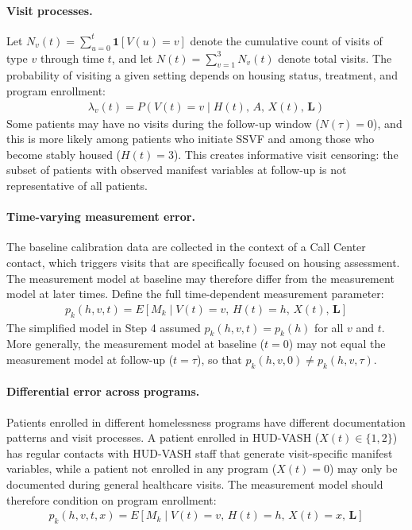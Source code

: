 \paragraph{Visit processes.} Let $N_v(t) = \sum_{u=0}^{t} \mathbf{1}[V(u)=v]$ denote the cumulative count of visits of type $v$ through time $t$, and let $N(t) = \sum_{v=1}^{3} N_v(t)$ denote total visits. The probability of visiting a given setting depends on housing status, treatment, and program enrollment:
\begin{align*}
    \lambda_v(t) = P(V(t)=v \mid H(t),\, A,\, X(t),\, \boldsymbol{L})
\end{align*}
Some patients may have no visits during the follow-up window ($N(\tau)=0$), and this is more likely among patients who initiate SSVF and among those who become stably housed ($H(t)=3$). This creates informative visit censoring: the subset of patients with observed manifest variables at follow-up is not representative of all patients.

\paragraph{Time-varying measurement error.} The baseline calibration data are collected in the context of a Call Center contact, which triggers visits that are specifically focused on housing assessment. The measurement model at baseline may therefore differ from the measurement model at later times. Define the full time-dependent measurement parameter:
\begin{align*}
    p_k(h, v, t) = E[M_k \mid V(t)=v,\, H(t)=h,\, X(t),\, \boldsymbol{L}]
\end{align*}
The simplified model in Step 4 assumed $p_k(h, v, t) = p_k(h)$ for all $v$ and $t$. More generally, the measurement model at baseline ($t=0$) may not equal the measurement model at follow-up ($t=\tau$), so that $p_k(h, v, 0) \neq p_k(h, v, \tau)$.

\paragraph{Differential error across programs.} Patients enrolled in different homelessness programs have different documentation patterns and visit processes. A patient enrolled in HUD-VASH ($X(t) \in \{1, 2\}$) has regular contacts with HUD-VASH staff that generate visit-specific manifest variables, while a patient not enrolled in any program ($X(t)=0$) may only be documented during general healthcare visits. The measurement model should therefore condition on program enrollment:
\begin{align*}
    p_k(h, v, t, x) = E[M_k \mid V(t)=v,\, H(t)=h,\, X(t)=x,\, \boldsymbol{L}]
\end{align*}

